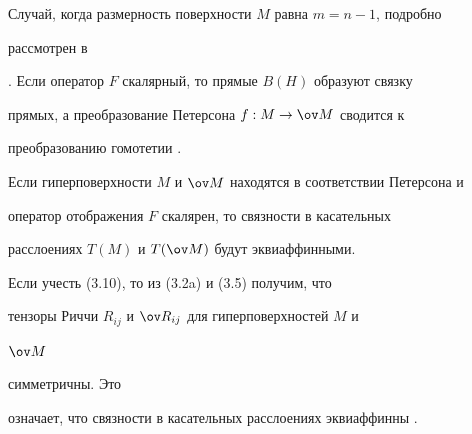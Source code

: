  


Случай, когда размерность поверхности $M$ равна $m=n-1$, подробно 


рассмотрен в 


\cite{6}. Если оператор $F$ скалярный, то прямые $B(H)$ образуют связку 


прямых, а преобразование Петерсона $f:M\to\ov M$ сводится к 


преобразованию гомотетии \cite{6}. 


 


\begin{cor} 


Если гиперповерхности $M$ и $\ov M$ находятся в соответствии Петерсона и 


оператор отображения $F$ скалярен, то связности в касательных 


расслоениях $T(M)$ и $T(\ov M)$ будут эквиаффинными. 


\end{cor} 


 


Если учесть (3.10), то из (3.2a) и (3.5) получим, что 


тензоры Риччи $R_{ij}$ и $\ov R_{ij}$ для гиперповерхностей $M$ и 


$\ov M$ 


симметричны. Это 


означает, что связности в касательных расслоениях эквиаффинны \cite{10}. 


 


